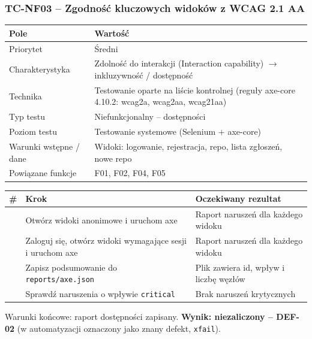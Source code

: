 \subsubsection{TC-NF03 – Zgodność kluczowych widoków z WCAG 2.1 AA}
{\small
\par\smallskip\noindent\begin{tabular}{>{\raggedright\arraybackslash}p{}>{\raggedright\arraybackslash}p{}}
\toprule
\textbf{Pole} & \textbf{Wartość} \\
\midrule
Priorytet & Średni \\
Charakterystyka & Zdolność do interakcji (Interaction capability) $\rightarrow$ inkluzywność / dostępność \\
Technika & Testowanie oparte na liście kontrolnej (reguły axe-core 4.10.2: wcag2a, wcag2aa, wcag21aa) \\
Typ testu & Niefunkcjonalny – dostępności \\
Poziom testu & Testowanie systemowe (Selenium + axe-core) \\
Warunki wstępne / dane & Widoki: logowanie, rejestracja, repo, lista zgłoszeń, nowe repo \\
Powiązane funkcje & F01, F02, F04, F05 \\
\bottomrule
\end{tabular}\par\smallskip
}
{\small
\par\smallskip\noindent\begin{tabular}{>{\raggedright\arraybackslash}p{}>{\raggedright\arraybackslash}p{}>{\raggedright\arraybackslash}p{}}
\toprule
\textbf{\#} & \textbf{Krok} & \textbf{Oczekiwany rezultat} \\
\midrule
1 & Otwórz widoki anonimowe i uruchom axe & Raport naruszeń dla każdego widoku \\
2 & Zaloguj się, otwórz widoki wymagające sesji i uruchom axe & Raport naruszeń dla każdego widoku \\
3 & Zapisz podsumowanie do \texttt{reports/\allowbreak{}axe.json} & Plik zawiera id, wpływ i liczbę węzłów \\
4 & Sprawdź naruszenia o wpływie \texttt{critical} & Brak naruszeń krytycznych \\
\bottomrule
\end{tabular}\par\smallskip
}
Warunki końcowe: raport dostępności zapisany. \textbf{Wynik: niezaliczony – DEF-02} (w automatyzacji oznaczony jako znany defekt, \texttt{xfail}).

